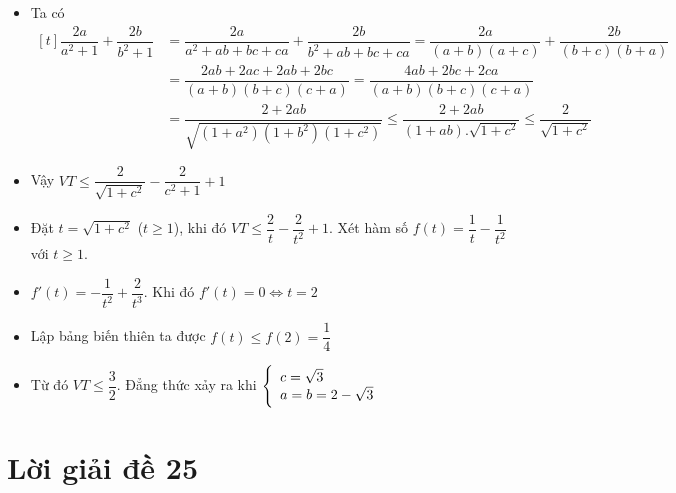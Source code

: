 \lgi 
\begin{itemize}[label=,leftmargin=*]
\item Ta có $\begin{aligned}[t]\dfrac{2a}{a^2+1}+\dfrac{2b}{b^2+1}&=\dfrac{2a}{a^2+ab+bc+ca}+\dfrac{2b}{b^2+ab+bc+ca}=\dfrac{2a}{(a+b)(a+c)}+\dfrac{2b}{(b+c)(b+a)}\\
&=\dfrac{2ab+2ac+2ab+2bc}{(a+b)(b+c)(c+a)}=\dfrac{4ab+2bc+2ca}{(a+b)(b+c)(c+a)} \\
&=\dfrac{2+2ab}{\sqrt{(1+a^2)(1+b^2)(1+c^2)}}\le  \dfrac{2+2ab}{(1+ab).\sqrt{1+c^2}} \le \dfrac{2}{\sqrt{1+c^2}}
\end{aligned}$
\item Vậy $VT\le \dfrac{2}{\sqrt{1+c^2}}-\dfrac{2}{c^2+1}+1$	
\item Đặt $t=\sqrt{1+c^2}$ ($t\ge 1$), khi đó $VT\le \dfrac{2}{t}-\dfrac{2}{t^2}+1$. Xét hàm số $f(t)=\dfrac{1}{t}-\dfrac{1}{t^2}$ với $t\ge 1$.
\item $f'(t)=-\dfrac{1}{t^2}+\dfrac{2}{t^3}$. Khi đó $f'(t)=0 \Leftrightarrow t=2$
\item Lập bảng biến thiên ta được $f(t)\le f(2)=\dfrac{1}{4}$
\item Từ đó $VT\le \dfrac{3}{2}$. Đẳng thức xảy ra khi $\left\{\begin{array}{ll}c=\sqrt{3}\\ a=b=2-\sqrt{3}\end{array}\right.$
\end{itemize}

\section{Lời giải đề 25}

